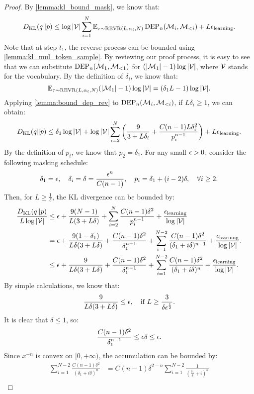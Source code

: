 \begin{proof}
    By \cref{lemma:kl_bound_mask}, we know that:
    $$D_{\mathrm{KL}}(q\|p) \leq \log |{\mathcal{V}}| \sum_{i=1}^N \mathbb{E}_{\tau\sim\operatorname{REVR}(L, \alpha_t, N)} \operatorname{DEP}_n({\mathcal{M}}_i, {\mathcal{M}}_{<i})+L{\epsilon}_\mathrm{learning}.$$
    Note that at step $t_1$, the reverse process can be bounded using \cref{lemma:kl_mul_token_sample}. By reviewing our proof process, it is easy to see that we can substitute $\operatorname{DEP}_n({\mathcal{M}}_1, {\mathcal{M}}_{<1})$ for $(|{\mathcal{M}}_1|-1)\log |{\mathcal{V}}|$, where ${\mathcal{V}}$ stands for the vocabulary. By the definition of $\delta_i$, we know that:
    $$\mathbb{E}_{\tau\sim\operatorname{REVR}(L, \alpha_t, N)} (|{\mathcal{M}}_1|-1)\log |{\mathcal{V}}|=(\delta_1L-1)\log |{\mathcal{V}}|.$$
    Applying \cref{lemma:bound_dep_rev} to $\operatorname{DEP}_n({\mathcal{M}}_i, {\mathcal{M}}_{<i})$, if $L\delta_i\geq 1$, we can obtain:
    $$D_{\mathrm{KL}}(q\|p)\leq \delta_1\log |{\mathcal{V}}|+\log |{\mathcal{V}}| \sum_{i=2}^N\left(\frac{9}{3+L\delta_i}+\frac{C(n-1)L\delta_i^2}{p_i^{n-1}}\right)+L{\epsilon}_\mathrm{learning}.$$
    By the definition of $p_i$, we know that $p_2=\delta_1$. For any small ${\epsilon}>0$, consider the following masking schedule:
    $$\delta_1={\epsilon},\quad \delta_i=\delta=\frac{{\epsilon}^n}{C(n-1)},\quad p_i=\delta_1+(i-2)\delta,\quad\forall i\geq 2.$$
    Then, for $L\geq \frac{1}{\delta}$, the KL divergence can be bounded by:
    \begin{align*}
        \frac{D_{\mathrm{KL}}(q\|p)}{L\log|{\mathcal{V}}|}&\leq {\epsilon}+\frac{9(N-1)}{L(3+L\delta)}+\sum_{i=2}^N \frac{C(n-1)\delta^2}{p_i^{n-1}}+\frac{{\epsilon}_\mathrm{learning}}{\log|{\mathcal{V}}|}\\
        &={\epsilon}+\frac{9(1-\delta_1)}{L\delta(3+L\delta)}+\frac{C(n-1)\delta^2}{\delta_1^{n-1}}+\sum_{i=1}^{N-2} \frac{C(n-1)\delta^2}{(\delta_1+i\delta)^{n-1}}+\frac{{\epsilon}_\mathrm{learning}}{\log|{\mathcal{V}}|}.\\
        &\leq {\epsilon}+\frac{9}{L\delta(3+L\delta)}+\frac{C(n-1)\delta^2}{\delta_1^{n-1}}+\sum_{i=1}^{N-2} \frac{C(n-1)\delta^2}{(\delta_1+i\delta)^{n}}+\frac{{\epsilon}_\mathrm{learning}}{\log|{\mathcal{V}}|}.
    \end{align*}
    By simple calculations, we know that:
    $$\frac{9}{L\delta(3+L\delta)}\leq {\epsilon},\quad \text{if }L\geq \frac{3}{\delta{\epsilon}^{\frac{1}{2}}}.$$
    It is clear that $\delta\leq 1$, so:
    $$\frac{C(n-1)\delta^2}{\delta_1^{n-1}}\leq {\epsilon}\delta\leq{\epsilon}.$$
    Since $x^{-n}$ is convex on $[0,+\infty)$, the accumulation can be bounded by:
    \begin{align*}
        \sum_{i=1}^{N-2} \frac{C(n-1)\delta^2}{(\delta_1+i\delta)^n}&=C(n-1)\delta^{2-n}\sum_{i=1}^{N-2}\frac{1}{(\frac{\delta_1}{\delta}+i)^n}\\

\end{align*}
\end{proof}
